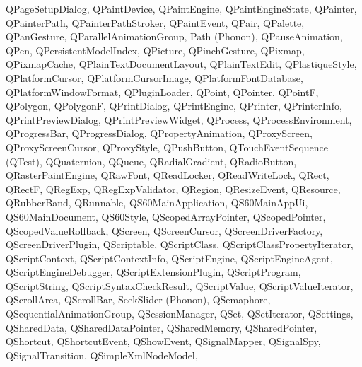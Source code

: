 {{        QPageSetupDialog,
        QPaintDevice,
        QPaintEngine,
        QPaintEngineState,
        QPainter,
        QPainterPath,
        QPainterPathStroker,
        QPaintEvent,
        QPair,
        QPalette,
        QPanGesture,
        QParallelAnimationGroup,
        Path (Phonon),
        QPauseAnimation,
        QPen,
        QPersistentModelIndex,
        QPicture,
        QPinchGesture,
        QPixmap,
        QPixmapCache,
        QPlainTextDocumentLayout,
        QPlainTextEdit,
        QPlastiqueStyle,
        QPlatformCursor,
        QPlatformCursorImage,
        QPlatformFontDatabase,
        QPlatformWindowFormat,
        QPluginLoader,
        QPoint,
        QPointer,
        QPointF,
        QPolygon,
        QPolygonF,
        QPrintDialog,
        QPrintEngine,
        QPrinter,
        QPrinterInfo,
        QPrintPreviewDialog,
        QPrintPreviewWidget,
        QProcess,
        QProcessEnvironment,
        QProgressBar,
        QProgressDialog,
        QPropertyAnimation,
        QProxyScreen,
        QProxyScreenCursor,
        QProxyStyle,
        QPushButton,
        QTouchEventSequence (QTest),
        QQuaternion,
        QQueue,
        QRadialGradient,
        QRadioButton,
        QRasterPaintEngine,
        QRawFont,
        QReadLocker,
        QReadWriteLock,
        QRect,
        QRectF,
        QRegExp,
        QRegExpValidator,
        QRegion,
        QResizeEvent,
        QResource,
        QRubberBand,
        QRunnable,
        QS60MainApplication,
        QS60MainAppUi,
        QS60MainDocument,
        QS60Style,
        QScopedArrayPointer,
        QScopedPointer,
        QScopedValueRollback,
        QScreen,
        QScreenCursor,
        QScreenDriverFactory,
        QScreenDriverPlugin,
        QScriptable,
        QScriptClass,
        QScriptClassPropertyIterator,
        QScriptContext,
        QScriptContextInfo,
        QScriptEngine,
        QScriptEngineAgent,
        QScriptEngineDebugger,
        QScriptExtensionPlugin,
        QScriptProgram,
        QScriptString,
        QScriptSyntaxCheckResult,
        QScriptValue,
        QScriptValueIterator,
        QScrollArea,
        QScrollBar,
        SeekSlider (Phonon),
        QSemaphore,
        QSequentialAnimationGroup,
        QSessionManager,
        QSet,
        QSetIterator,
        QSettings,
        QSharedData,
        QSharedDataPointer,
        QSharedMemory,
        QSharedPointer,
        QShortcut,
        QShortcutEvent,
        QShowEvent,
        QSignalMapper,
        QSignalSpy,
        QSignalTransition,
        QSimpleXmlNodeModel,
}}
